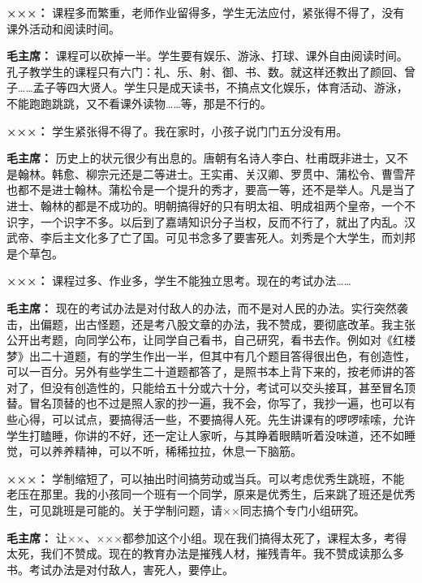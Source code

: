 \begin{duihua}
\item[\textbf{×××：}] 课程多而繁重，老师作业留得多，学生无法应付，紧张得不得了，没有课外活动和阅读时间。

\item[\textbf{毛主席：}] 课程可以砍掉一半。学生要有娱乐、游泳、打球、课外自由阅读时间。孔子教学生的课程只有六门：礼、乐、射、御、书、数。就这样还教出了颜回、曾子……孟子等四大贤人。学生只是成天读书，不搞点文化娱乐，体育活动、游泳，不能跑跑跳跳，又不看课外读物……等，那是不行的。

\item[\textbf{×××：}] 学生紧张得不得了。我在家时，小孩子说门门五分没有用。

\item[\textbf{毛主席：}] 历史上的状元很少有出息的。唐朝有名诗人李白、杜甫既非进士，又不是翰林。韩愈、柳宗元还是二等进士。王实甫、关汉卿、罗贯中、蒲松令、曹雪芹也都不是进士翰林。蒲松令是一个提升的秀才，要高一等，还不是举人。凡是当了进士、翰林的都是不成功的。明朝搞得好的只有明太祖、明成祖两个皇帝，一个不识字，一个识字不多。以后到了嘉靖知识分子当权，反而不行了，就出了内乱。汉武帝、李后主文化多了亡了国。可见书念多了要害死人。刘秀是个大学生，而刘邦是个草包。

\item[\textbf{×××：}] 课程过多、作业多，学生不能独立思考。现在的考试办法……

\item[\textbf{毛主席：}] 现在的考试办法是对付敌人的办法，而不是对人民的办法。实行突然袭击，出偏题，出古怪题，还是考八股文章的办法，我不赞成，要彻底改革。我主张公开出考题，向同学公布，让同学自己看书，自己研究，看书去作。例如对《红楼梦》出二十道题，有的学生作出一半，但其中有几个题目答得很出色，有创造性，可以一百分。另外有些学生二十道题都答了，是照书本上背下来的，按老师讲的答对了，但没有创造性的，只能给五十分或六十分，考试可以交头接耳，甚至冒名顶替。冒名顶替的也不过是照人家的抄一遍，我不会，你写了，我抄一遍，也可以有些心得，可以试点，要搞得活一些，不要搞得人死。先生讲课有的啰啰嗦嗦，允许学生打瞌睡，你讲的不好，还一定让人家听，与其睁着眼睛听着没味道，还不如睡觉，可以养养精神，可以不听，稀稀拉拉，休息一下脑筋。

\item[\textbf{×××：}] 学制缩短了，可以抽出时间搞劳动或当兵。可以考虑优秀生跳班，不能老压在那里。我的小孩同一个班有一个同学，原来是优秀生，后来跳了班还是优秀生，可见跳班是可能的。关于学制问题，请××同志搞个专门小组研究。

\item[\textbf{毛主席：}] 让××、×××都参加这个小组。现在我们搞得太死了，课程太多，考得太死，我们不赞成。现在的教育办法是摧残人材，摧残青年。我不赞成读那么多书。考试办法是对付敌人，害死人，要停止。


\end{duihua}
